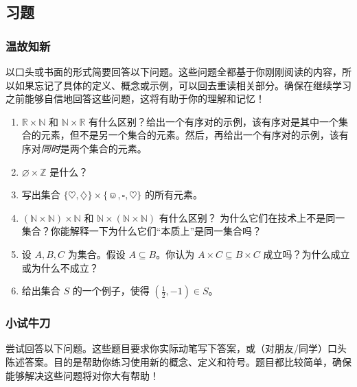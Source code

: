 \subsection{习题}

\subsubsection*{温故知新}

以口头或书面的形式简要回答以下问题。这些问题全都基于你刚刚阅读的内容，所以如果忘记了具体的定义、概念或示例，可以回去重读相关部分。确保在继续学习之前能够自信地回答这些问题，这将有助于你的理解和记忆！

\begin{enumerate}[label=(\arabic*)]
    \item $\mathbb{R} \times \mathbb{N}$ 和 $\mathbb{N} \times \mathbb{R}$ 有什么区别？给出一个有序对的示例，该有序对是其中一个集合的元素，但不是另一个集合的元素。然后，再给出一个有序对的示例，该有序对\emph{同时}是两个集合的元素。
    \item $\varnothing \times \mathbb{Z}$ 是什么？
    \item 写出集合 $\{\heartsuit, \diamondsuit\} \times \{\smiley{}, \square, \heartsuit\}$ 的所有元素。
    \item $(\mathbb{N} \times \mathbb{N}) \times \mathbb{N}$ 和 $\mathbb{N} \times (\mathbb{N} \times \mathbb{N})$ 有什么区别？ 为什么它们在技术上不是同一集合？你能解释一下为什么它们``本质上''是同一集合吗？
    \item 设 $A,B,C$ 为集合。假设 $A \subseteq B$。你认为 $A \times C \subseteq B \times C$ 成立吗？为什么成立或为什么不成立？
    \item 给出集合 $S$ 的一个例子，使得 $(\frac{1}{2}, -1) \in S$。
\end{enumerate}

\subsubsection*{小试牛刀}

尝试回答以下问题。这些题目要求你实际动笔写下答案，或（对朋友/同学）口头陈述答案。目的是帮助你练习使用新的概念、定义和符号。题目都比较简单，确保能够解决这些问题将对你大有帮助！

